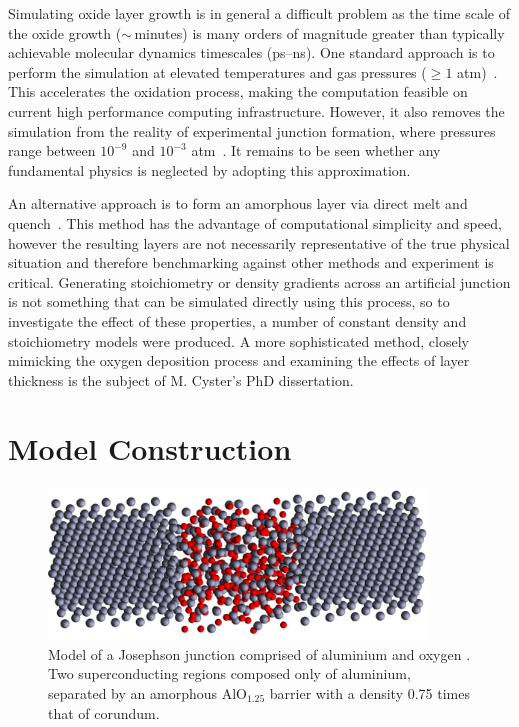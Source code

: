 Simulating oxide layer growth is in general a difficult problem as the time scale of the oxide growth ($\sim\,$minutes) is many orders of magnitude greater than typically achievable molecular dynamics timescales (ps--ns).
One standard approach is to perform the simulation at elevated temperatures and gas pressures ($\ge 1$ atm)~\cite{Campbell1999, Zhou2005, Hasnaoui2005}.
This accelerates the oxidation process, making the computation feasible on current high performance computing infrastructure.
However, it also removes the simulation from the reality of experimental junction formation, where pressures range between $10^{-9}$ and $10^{-3}$ atm~\cite{Morohashi1987, Kohlstedt1993, Jeurgens2002}.
It remains to be seen whether any fundamental physics is neglected by adopting this approximation.

An alternative approach is to form an amorphous layer via direct melt and quench~\cite{Vashishta2008,Sheng2012}.
This method has the advantage of computational simplicity and speed, however the resulting layers are not necessarily representative of the true physical situation and therefore benchmarking against other methods and experiment is critical.
Generating stoichiometry or density gradients across an artificial junction is not something that can be simulated directly using this process, so to investigate the effect of these properties, a number of constant density and stoichiometry models were produced. A more sophisticated method, closely mimicking the oxygen deposition process and examining the effects of layer thickness is the subject of M. Cyster's PhD dissertation.

\section{Model Construction}\label{sec:model}
\begin{figure}[htp]
\includegraphics[width=0.9\textwidth]{figures/AlO125_075}
\caption[Atomistic Josephson Junction Model]{\label{fig:povray}Model of a Josephson junction comprised of aluminium  and oxygen . Two superconducting regions composed only of aluminium, separated by an amorphous AlO$_{1.25}$ barrier with a density 0.75 times that of corundum.}%
\end{figure}


